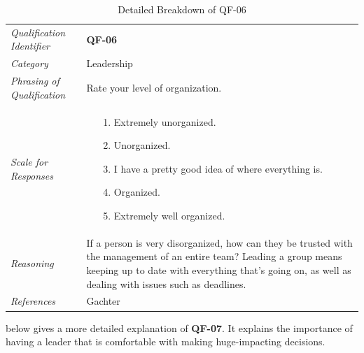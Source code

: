 \documentclass[12pt,letterpaper]{article}
\begin{document}
\begin{table}[H]
	\caption{Detailed Breakdown of QF-06}
	\begin{tabu} to 
		\toprule
		Qualification Identifier & {\bf QF-06}\\
		Category & Leadership \\
		Phrasing of Qualification & Rate your level of organization.\\
		Scale for Responses &
		\begin{minipage}[t]{\linewidth}
			\begin{enumerate}
				\item[1.] Extremely unorganized.
				\item[2.] Unorganized.
				\item[3.] I have a pretty good idea of where everything is.
				\item[4.] Organized.
				\item[5.] Extremely well organized.
			\end{enumerate}
		\end{minipage}\\
		Reasoning & If a person is very disorganized, how can they be trusted with the management of an entire team? Leading a group means keeping up to date with everything that's going on, as well as dealing with issues such as deadlines.\\
		References & Gachter\cite{gachter}\\
		\toprule
	\end{tabu}
\end{table}

\newpage{}

 below gives a more detailed explanation of {\bf QF-07}. It explains the importance of having a leader that is comfortable with making huge-impacting decisions.
\end{document}
